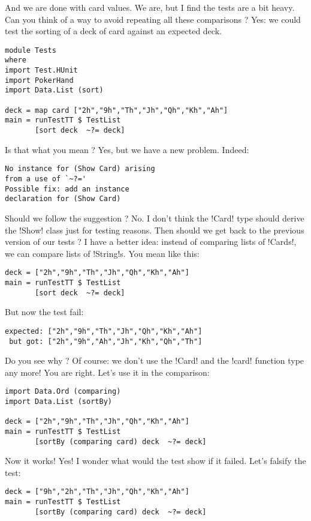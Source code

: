 \success And we are done with card values.
\lhN We are, but I find the tests are a bit heavy. Can you think of a way to avoid repeating all these comparisons ?
\lhA Yes: we could test the sorting of a deck of card against an expected deck.
\lhN 
\begin{lstlisting}[frame=single]
module Tests
where 
import Test.HUnit
import PokerHand
import Data.List (sort)

deck = map card ["2h","9h","Th","Jh","Qh","Kh","Ah"]
main = runTestTT $ TestList 
       [sort deck  ~?= deck]
\end{lstlisting} %
Is that what you mean ?
\lhA \error Yes, but we have a new problem.
\lhN \error Indeed:
\begin{verbatim}
No instance for (Show Card) arising
from a use of `~?='
Possible fix: add an instance 
declaration for (Show Card)
\end{verbatim}
Should we follow the suggestion ?
\lhA \error No. I don't think the \il!Card! type should derive the \il!Show! class just for testing reasons.
\lhN Then should we get back to the previous version of our tests ?
\lhA I have a better idea: instead of comparing lists of \il!Cards!, we can compare lists of \il!String!s.
\lhN \error You mean like this: 
\begin{lstlisting}[frame=single]
deck = ["2h","9h","Th","Jh","Qh","Kh","Ah"]
main = runTestTT $ TestList 
       [sort deck  ~?= deck]
\end{lstlisting} %
\failure But now the test fail:
\begin{verbatim}
expected: ["2h","9h","Th","Jh","Qh","Kh","Ah"]
 but got: ["2h","9h","Ah","Jh","Kh","Qh","Th"]
\end{verbatim}
Do you see why ?
\lhA \failure Of course: we don't use the \il!Card! and the \il!card! function type any more!
\lhN You are right. Let's use it in the comparison:
\begin{lstlisting}[frame=single]
import Data.Ord (comparing)
import Data.List (sortBy)

deck = ["2h","9h","Th","Jh","Qh","Kh","Ah"]
main = runTestTT $ TestList 
       [sortBy (comparing card) deck  ~?= deck]
\end{lstlisting} %
\success Now it works!
\lhA Yes!
\lhN I wonder what would the test show if it failed. Let's falsify the test:
\begin{lstlisting}[frame=single]
deck = ["9h","2h","Th","Jh","Qh","Kh","Ah"]
main = runTestTT $ TestList 
       [sortBy (comparing card) deck  ~?= deck]
\end{lstlisting} %
